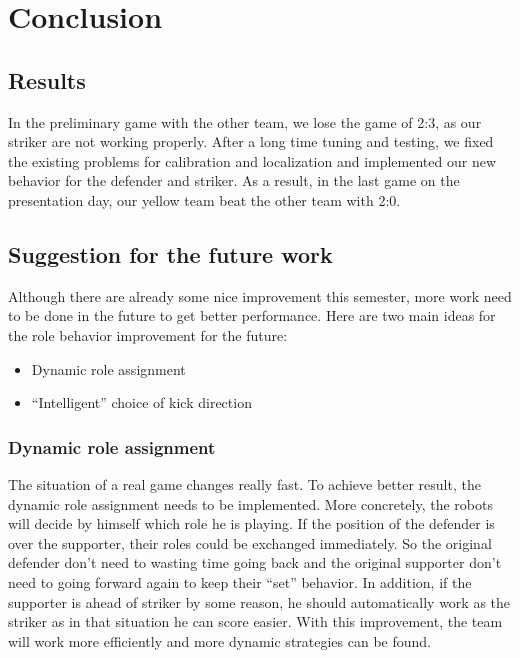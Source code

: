 \chapter{Conclusion}
\section{Results}
In the preliminary game with the other team, we lose the game of 2:3, as our striker are not working properly. After a long time tuning and testing, we fixed the existing problems for calibration and localization and implemented our new behavior for the defender and striker. As a result, in the last game on the presentation day, our yellow team beat the other team with 2:0.
\section{Suggestion for the future work}
Although there are already some nice improvement this semester, more work need to be done in the future to get better performance. Here are two main ideas for the role behavior improvement for the future:
\begin{itemize}
    \item Dynamic role assignment
    \item ``Intelligent'' choice of kick direction
\end{itemize}
\subsection{Dynamic role assignment}
The situation of a real game changes really fast. To achieve better result, the dynamic role assignment needs to be implemented. More concretely, the robots will decide by himself which role he is playing. If the position of the defender is over the supporter, their roles could be exchanged immediately. So the original defender don't need to wasting time going back and the original supporter don't need to going forward again to keep their ``set'' behavior. In addition, if the supporter is ahead of striker by some reason, he should automatically work as the striker as in that situation he can score easier.
With this improvement, the team will work more efficiently and more dynamic strategies can be found.
